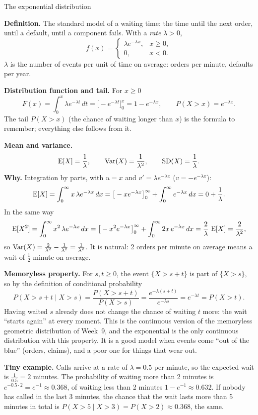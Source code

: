 \begin{key}{The exponential distribution}
	\setlength{\parskip}{5pt}
	\begin{minipage}[t]{.5\linewidth}
		\textbf{Definition.} The standard model of a waiting time: the time
		until the next order, until a default, until a component fails. With
		a \emph{rate} $\lambda>0$,
		\[ f(x)=\begin{cases}\lambda e^{-\lambda x}, & x\ge0,\\
				0, & x<0.\end{cases} \]
		$\lambda$ is the number of events per unit of time on average: orders
		per minute, defaults per year.
	\end{minipage}\hfill
	\begin{minipage}[t]{.46\linewidth}
		\centering\vspace{-2mm}
		\figexponential
	\end{minipage}

	\textbf{Distribution function and tail.} For $x\ge0$
	\[ F(x)=\int_0^x\lambda e^{-\lambda t}\,dt=\big[-e^{-\lambda t}\big]_0^x
		=1-e^{-\lambda x},\qquad P(X>x)=e^{-\lambda x}. \]
	The tail $P(X>x)$ (the chance of waiting longer than $x$) is the formula
	to remember; everything else follows from it.

	\textbf{Mean and variance.}
	\[ \operatorname{E}[X]=\frac1\lambda,\qquad\operatorname{Var}(X)=\frac1{\lambda^2},\qquad
		\operatorname{SD}(X)=\frac1\lambda. \]
	\textbf{Why.} Integration by parts, with $u=x$ and $v'=\lambda e^{-\lambda x}$
	($v=-e^{-\lambda x}$):
	\[ \operatorname{E}[X]=\int_0^\infty x\,\lambda e^{-\lambda x}\,dx
		=\big[-xe^{-\lambda x}\big]_0^\infty+\int_0^\infty e^{-\lambda x}\,dx
		=0+\frac1\lambda. \]
	In the same way
	\[ \operatorname{E}[X^2]=\int_0^\infty x^2\,\lambda e^{-\lambda x}\,dx
		=\big[-x^2e^{-\lambda x}\big]_0^\infty+\int_0^\infty2x\,e^{-\lambda x}\,dx
		=\frac2\lambda\,\operatorname{E}[X]=\frac{2}{\lambda^2}, \]
	so $\operatorname{Var}(X)=\frac2{\lambda^2}-\frac1{\lambda^2}=\frac1{\lambda^2}$. It is
	natural: 2 orders per minute on average means a wait of $\frac12$ minute
	on average.

	\textbf{Memoryless property.} For $s,t\ge0$, the event $\{X>s+t\}$ is
	part of $\{X>s\}$, so by the definition of conditional probability
	\[ P(X>s+t\mid X>s)=\frac{P(X>s+t)}{P(X>s)}
		=\frac{e^{-\lambda(s+t)}}{e^{-\lambda s}}=e^{-\lambda t}=P(X>t). \]
	Having waited $s$ already does not change the chance of waiting $t$ more:
	the wait ``starts again'' at every moment. This is the continuous
	version of the memoryless geometric distribution of Week~9, and the
	exponential is the only continuous distribution with this property. It
	is a good model when events come ``out of the blue'' (orders, claims), and
	a poor one for things that wear out.

	\textbf{Tiny example.} Calls arrive at a rate of $\lambda=0.5$ per
	minute, so the expected wait is $\frac1{0.5}=2$ minutes. The probability
	of waiting more than 2 minutes is $e^{-0.5\cdot2}=e^{-1}\approx0.368$, of
	waiting less than 2 minutes $1-e^{-1}\approx0.632$. If nobody has called
	in the last 3 minutes, the chance that the wait lasts more than 5 minutes
	in total is $P(X>5\mid X>3)=P(X>2)\approx0.368$, the same.
\end{key}

